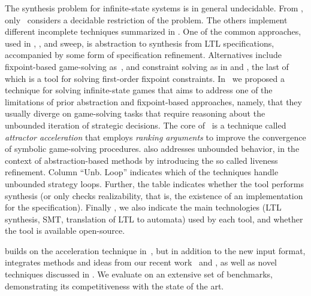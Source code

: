 

\vspace{-.9cm}

The synthesis problem for infinite-state systems is in general undecidable.  
From ,  only~\cite{RodriguezS23,RodriguezS24}  considers a decidable restriction of the problem. The others implement different incomplete techniques summarized in .
One of the common approaches,  used in \temos, \raboniel,  and sweep,  is abstraction to synthesis from LTL specifications, accompanied by some form of specification refinement.  Alternatives include  fixpoint-based game-solving as~\cite{SamuelDK21,SamuelDK23}, and constraint solving as in \simsynth and \muval, the last of which is a tool for solving first-order fixpoint constraints.
In~\cite{HeimD24} we proposed a technique for solving infinite-state games that aims to address one of the limitations of prior abstraction and fixpoint-based approaches, namely, that they usually diverge on game-solving tasks that require reasoning about the unbounded iteration of strategic decisions.  
The core of~\cite{HeimD24} is a technique called \emph{attractor acceleration} that employs \emph{ranking arguments} to improve the convergence of symbolic game-solving procedures. 
\cite{AzzopardiPSS24}  also addresses unbounded behavior,  in the context of abstraction-based methods by introducing the so called liveness refinement. 
Column ``Unb.  Loop'' indicates which of the techniques handle unbounded strategy loops.  Further, the table indicates whether the tool performs synthesis (or only checks realizability,  that is, the existence of an implementation for the specification). Finally , we also indicate the main technologies (LTL synthesis,  SMT, translation of LTL to automata) used by each tool, and whether the tool is available open-source. 

 \issy builds on the acceleration technique in~\cite{HeimD24},  but in addition to the new input format,  integrates methods and ideas from our recent work~\cite{SchmuckHDN24} and \cite{HeimD25},  as well as novel techniques discussed in . 
We evaluate \issy on an extensive set of benchmarks,  demonstrating its competitiveness with the state of the art.




